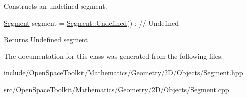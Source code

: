 Constructs an undefined segment. 


\begin{DoxyCode}
\hyperlink{classostk_1_1math_1_1geom_1_1d2_1_1objects_1_1_segment_a56c91f22315d7cefe9d5e9973330028d}{Segment} segment = \hyperlink{classostk_1_1math_1_1geom_1_1d2_1_1objects_1_1_segment_a44d3a5817296d96bf82ebbc459055025}{Segment::Undefined}() ; \textcolor{comment}{// Undefined}
\end{DoxyCode}


\begin{DoxyReturn}{Returns}
Undefined segment 
\end{DoxyReturn}


The documentation for this class was generated from the following files\+:\begin{DoxyCompactItemize}
\item 
include/\+Open\+Space\+Toolkit/\+Mathematics/\+Geometry/2\+D/\+Objects/\hyperlink{2_d_2_objects_2_segment_8hpp}{Segment.\+hpp}\item 
src/\+Open\+Space\+Toolkit/\+Mathematics/\+Geometry/2\+D/\+Objects/\hyperlink{2_d_2_objects_2_segment_8cpp}{Segment.\+cpp}\end{DoxyCompactItemize}
